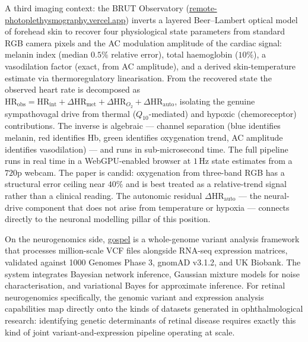 \documentclass[12pt,a4paper]{article}
\begin{document}
A third imaging context: the BRUT Observatory
(\href{https://remote-photoplethysmography.vercel.app/}{remote-photoplethysmography.vercel.app})
inverts a layered Beer--Lambert optical model of forehead skin to recover
four physiological state parameters from standard RGB camera pixels and the
AC modulation amplitude of the cardiac signal: melanin index (median
$0.5\%$ relative error), total haemoglobin ($10\%$), a vasodilation factor
(exact, from AC amplitude), and a derived skin-temperature estimate via
thermoregulatory linearisation. From the recovered state the observed heart
rate is decomposed as
$\mathrm{HR}_\mathrm{obs} = \mathrm{HR}_\mathrm{int} + \Delta\mathrm{HR}_\mathrm{met}
+ \Delta\mathrm{HR}_{O_2} + \Delta\mathrm{HR}_\mathrm{auto}$,
isolating the genuine sympathovagal drive from thermal ($Q_{10}$-mediated)
and hypoxic (chemoreceptor) contributions. The inverse is algebraic ---
channel separation (blue identifies melanin, red identifies Hb, green
identifies oxygenation trend, AC amplitude identifies vasodilation) ---
and runs in sub-microsecond time. The full pipeline runs in real time
in a WebGPU-enabled browser at $1\,\mathrm{Hz}$ state estimates from a
$720\mathrm{p}$ webcam. The paper is candid: oxygenation from three-band
RGB has a structural error ceiling near $40\%$ and is best treated as a
relative-trend signal rather than a clinical reading. The autonomic residual
$\Delta\mathrm{HR}_\mathrm{auto}$ --- the neural-drive component that
does not arise from temperature or hypoxia --- connects directly to the
neuronal modelling pillar of this position.

On the neurogenomics side, \href{https://github.com/fullscreen-triangle/gospel}{gospel}
is a whole-genome variant analysis framework that processes million-scale VCF files
alongside RNA-seq expression matrices, validated against 1000 Genomes Phase 3,
gnomAD v3.1.2, and UK Biobank. The system integrates Bayesian network inference,
Gaussian mixture models for noise characterisation, and variational Bayes for approximate
inference. For retinal neurogenomics specifically, the genomic variant and expression
analysis capabilities map directly onto the kinds of datasets generated in
ophthalmological research: identifying genetic determinants of retinal disease requires
exactly this kind of joint variant-and-expression pipeline operating at scale.
\end{document}
